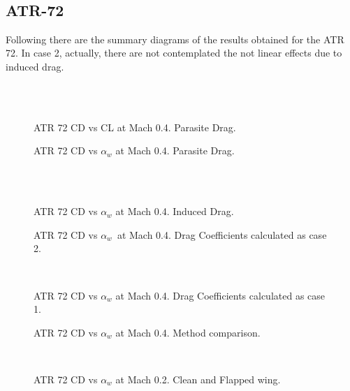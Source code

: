 \noindent \\

\subsection{ATR-72}

Following there are the summary diagrams of the results obtained for the ATR 72. In case 2, actually, there are not  contemplated the not linear effects due to induced drag.

\noindent \\ \\
\begin{figure}[H]
\centering

\caption{ATR 72 CD vs CL at Mach 0.4. Parasite Drag.}
\label{fig:DragATR}
\end{figure}

\begin{figure}[H]
\centering

\caption{ATR 72 CD vs $\alpha_w$ at Mach 0.4. Parasite Drag.}
\label{fig:DragATR}
\end{figure}
\noindent \\\\
\begin{figure}[H]
\centering

\caption{ATR 72 CD vs $\alpha_w$ at Mach 0.4. Induced Drag.}
\label{fig:DragATR}
\end{figure}

\begin{figure}[H]
\centering

\caption{ATR 72 CD vs $\alpha_w$\  at Mach 0.4. Drag Coefficients calculated as case 2.}
\label{fig:DragATR}
\end{figure}
\noindent \\
\begin{figure}[H]
\centering

\caption{ATR 72 CD vs $\alpha_w$  at Mach 0.4. Drag Coefficients calculated as case 1.}
\label{fig:DragATR}
\end{figure}

\begin{figure}[H]
\centering

\caption{ATR 72 CD vs $\alpha_w$  at Mach 0.4. Method comparison.}
\label{fig:DragATR}
\end{figure}

\noindent \\
\begin{figure}[H]
\centering

\caption{ATR 72 CD vs $\alpha_w$  at Mach 0.2. Clean and Flapped wing.}
\label{fig:DragATR}
\end{figure}


